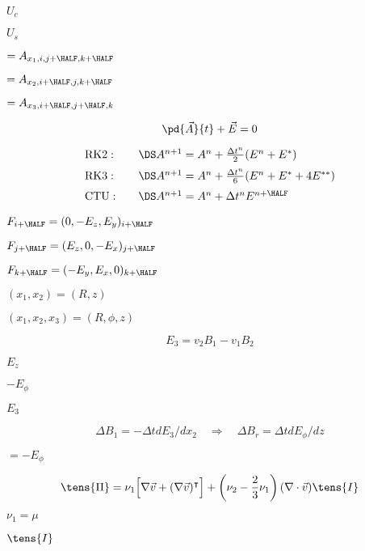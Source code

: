 \documentclass{article}
\begin{document}
$ U_c $
\pagebreak

$ U_s $
\pagebreak

$= A_{x_1, i, j+\HALF, k+\HALF}$
\pagebreak

$= A_{x_2, i+\HALF, j, k+\HALF}$
\pagebreak

$= A_{x_3, i+\HALF, j+\HALF, k}$
\pagebreak

\[
   \pd{\vec{A}}{t} + \vec{E} = 0
\]
\pagebreak

\[
 \begin{array}{ll}
  \rm{RK2:}\quad &\DS A^{n+1} = A^n + \frac{\Delta t^n}{2} (E^n + E^*) 
    \\ \noalign{\medskip}
  \rm{RK3:}\quad &\DS A^{n+1} = A^n + \frac{\Delta t^n}{6} (E^n + E^* + 4E^{**}) 
    \\ \noalign{\medskip}
  \rm{CTU:}\quad &\DS A^{n+1} = A^n + \Delta t^nE^{n+\HALF}
 \end{array}        
\]
\pagebreak

$ F_{i+\HALF} = (   0,-E_z, E_y)_{i+\HALF}$
\pagebreak

$ F_{j+\HALF} = ( E_z,   0,-E_x)_{j+\HALF}$
\pagebreak

$ F_{k+\HALF} = (-E_y, E_x,   0)_{k+\HALF}$
\pagebreak

$ (x_1,x_2) = (R,z) $
\pagebreak

$ (x_1,x_2,x_3) = (R,\phi,z)$
\pagebreak

\[
   E_3 = v_2B_1 - v_1B_2
\]
\pagebreak

$ E_z $
\pagebreak

$ -E_\phi $
\pagebreak

$ E_3 $
\pagebreak

\[
\Delta B_1 = -\Delta t dE_3/dx_2 \quad\Longrightarrow\quad
\Delta B_r =  \Delta t dE_\phi/dz
\]
\pagebreak

$ = -E_\phi $
\pagebreak

\[                                                      
    \tens{\Pi} =  \nu_1\Big[\nabla\vec{v} + (\nabla\vec{v})^\intercal\Big]
                + \left(\nu_2 - \frac{2}{3}\nu_1\right)(\nabla\cdot\vec{v}) \tens{I}
  \]
\pagebreak

$\nu_1 = \mu$
\pagebreak

$\tens{I}$
\pagebreak
\end{document}
